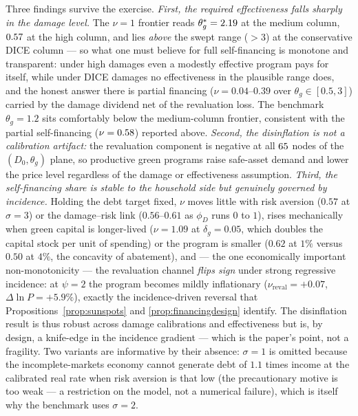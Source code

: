 \documentclass[12pt]{article}
\begin{document}
Three findings survive the exercise. \emph{First, the required
effectiveness falls sharply in the damage level.} The $\nu=1$ frontier reads
$\theta_g^{*}=2.19$ at the medium column, $0.57$ at the
\citet{bilalkanzig2024} high column, and lies \emph{above} the swept range
($>3$) at the conservative DICE column --- so what one must believe for full
self-financing is monotone and transparent: under high damages even a
modestly effective program pays for itself, while under DICE damages no
effectiveness in the plausible range does, and the honest answer there is
partial financing ($\nu=0.04$--$0.39$ over $\theta_g\in[0.5,3]$) carried by
the damage dividend net of the revaluation loss. The benchmark $\theta_g=1.2$
sits comfortably below the medium-column frontier, consistent with the
partial self-financing ($\nu=0.58$) reported above. \emph{Second, the
disinflation is not a calibration artifact:} the revaluation component is
negative at all $65$
nodes of the $(D_0,\theta_g)$ plane, so productive green programs raise
safe-asset demand and lower the price level regardless of the damage or
effectiveness assumption. \emph{Third, the self-financing share is stable to
the household side but genuinely governed by incidence.} Holding the debt
target fixed, $\nu$ moves little with risk aversion ($0.57$ at $\sigma=3$)
or the damage--risk link ($0.56$--$0.61$ as $\phi_D$ runs $0$ to $1$), rises
mechanically when green capital is longer-lived ($\nu=1.09$ at
$\delta_g=0.05$, which doubles the capital stock per unit of spending) or
the program is smaller ($0.62$ at $1\%$ versus $0.50$ at $4\%$, the
concavity of abatement), and --- the one economically important
non-monotonicity --- the revaluation channel \emph{flips sign} under strong
regressive incidence: at $\psi=2$ the program becomes mildly inflationary
($\nu_{\mathrm{reval}}=+0.07$, $\Delta\ln P=+5.9\%$), exactly the
incidence-driven reversal that Propositions~\ref{prop:sunspots} and
\ref{prop:financingdesign} identify. The disinflation result is thus robust
across damage calibrations and effectiveness but is, by design, a knife-edge
in the incidence gradient --- which is the paper's point, not a fragility.
Two variants are informative by their absence: $\sigma=1$ is omitted because
the incomplete-markets economy cannot generate debt of $1.1$ times income at
the calibrated real rate when risk aversion is that low (the precautionary
motive is too weak --- a restriction on the model, not a numerical failure),
which is itself why the benchmark uses $\sigma=2$.
\end{document}
